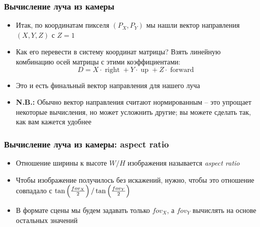 \documentclass[10pt]{beamer}
\begin{document}
\begin{frame}
\frametitle{Вычисление луча из камеры}
\begin{itemize}
\item Итак, по координатам пикселя \begin{math}(P_X, P_Y)\end{math} мы нашли вектор направления \begin{math}(X, Y, Z)\end{math} с \begin{math}Z=1\end{math}
\pause
\item Как его перевести в систему координат матрицы? \pause Взять линейную комбинацию осей матрицы с этими коэффициентами:
\begin{equation}
D = X\cdot\operatorname{right}+Y\cdot\operatorname{up}+Z\cdot\operatorname{forward}
\end{equation}
\pause
\item Это и есть финальный вектор направления для нашего луча
\pause
\item \alert{\textbf{N.B.:}} Обычно вектор направления считают нормированным -- это упрощает некоторые вычисления, но может усложнить другие; вы можете сделать так, как вам кажется удобнее
\end{itemize}
\end{frame}

\begin{frame}
\frametitle{Вычисление луча из камеры: aspect ratio}
\begin{itemize}
\item Отношение ширины к высоте \begin{math}W / H\end{math} изображения называется \textit{aspect ratio}
\pause
\item Чтобы изображение получилось без искажений, нужно, чтобы это отношение совпадало с \begin{math}\tan\left({fov_X\over 2}\right) / \tan\left({fov_Y\over 2}\right)\end{math}
\pause
\item В формате сцены мы будем задавать только \begin{math}fov_X\end{math}, а \begin{math}fov_Y\end{math} вычислять на основе остальных значений
\end{itemize}
\end{frame}
\end{document}
